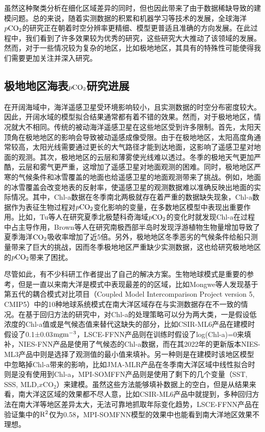 虽然这种聚类分析在细化区域差异的同时，但也因此带来了由于数据稀缺导致的建模问题。总的来说，随着实测数据的积累和机器学习等技术的发展，全球海洋$p\rm CO_2$的研究正在朝着时空分辨率更精细、模型更普适且准确的方向发展。在此过程中，我们看到了许多效果较为优秀的研究，这些研究大大推动了该领域的发展。然而，对于一些情况较为复杂的地区，比如极地地区，其具有的特殊性可能使得我们需要更加关注并深入研究。

\subsection{极地地区海表\texorpdfstring{$p\rm CO_2$}{}研究进展}
在开阔海域中，海洋遥感卫星受环境影响较小，且实测数据的时空分布密度较大。因此，开阔水域的模型拟合结果通常都有着不错的效果。然而，对于极地地区，情况就大不相同。传统的被动海洋遥感卫星在这些地区受到许多限制。首先，太阳天顶角在极地地区的影响会导致被动遥感成像受限。由于在极地地区，太阳高度角通常较高，太阳光线需要通过更长的大气路径才能到达地面，这影响了遥感卫星对地面的观测。其次，极地地区的云层和薄雾使光线难以透过。冬季的极地天气更加严酷，云层和雾气更严重，这增加了遥感卫星对地面观测的困难。同时，极地地区严寒的气候条件和冰雪覆盖的地面也给遥感卫星的地面观测带来了挑战。例如，地面的冰雪覆盖会改变地表的反射率，使遥感卫星的观测数据难以准确反映出地面的实际情况。其中，Chl-a数据在冬季南北两极就存在着严重的数据缺失现象，Chl-a数据作为表征生物过程对$p\rm CO_2$变化影响的变量，在多数地区模型中表现出重要作用。比如，Tu等人\cite{tu2021increase}在研究夏季北极楚科奇海域$p\rm CO_2$的变化时就发现Chl-a在过程中占主导作用，Brown等人\cite{brown2019enhanced}在研究南极西部半岛时发现浮游植物生物量增加导致了夏季海洋$\rm CO_2$吸收率增加了近5倍。另外，极地地区冬季恶劣的气候条件给船只测量带来了巨大的挑战，因而冬季极地地区严重缺少实测数据，这也给研究极地地区的$p\rm CO_2$带来了困扰。

尽管如此，有不少科研工作者提出了自己的解决方案。生物地球模式\cite{mongwe2016seasonal,mongwe2018seasonal,kessler2016southern}是重要的参考，但是一直以来南大洋是模式中表现最差的的区域，比如Mongwe等人\cite{mongwe2018seasonal}发现基于第五代的耦合模式对比项目（Coupled Model Intercomparison Project version 5, CMIP5）中的10种地球系统模式在南大洋区域存在与实测数据存在不一致的情况。在基于回归方法的研究中，对Chl-a的处理策略可以分为两大类，一是假设低浓度的Chl-a值或是气候态值来替代这缺失的部分，比如CSIR-ML6产品\cite{CSIR_ML6}在建模时假设了0.1±0.03$\rm mg m^{-3}$，LSCE-FFNN产品\cite{LSCE_FFNN}则在训练时假设了log(Chl-a)=0来填补，NIES-FNN产品\cite{zeng2014global}是使用了气候态的Chl-a数据，而在其2022年的更新版本NIES-ML3产品\cite{zeng2022surface}中则是选择了观测值的最小值来填补。另一种则是在建模时该地区模型中忽略掉Chl-a带来的影响，比如JMA-MLR产品\cite{JMA_MLR}在冬季南大洋区域中线性拟合时则是没有使用到Chl-a，MPI-SOMFFN产品\cite{MPI_SOMFFN}则是使用了剩下的几个变量（SST, SSS, MLD,$x\mathrm{CO_2}$）来建模。虽然这些方法能够填补数据上的空白，但是从结果来看，南大洋这区域的效果都不尽人意，比如CSIR-ML6产品\cite{CSIR_ML6}中就提到，多种回归方法在南大洋等地区差异太大，无法可靠地抓取年际变化趋势，LSCE-FFNN产品\cite{LSCE_FFNN}在验证集中的$\rm R^2$仅为0.58，MPI-SOMFNN模型\cite{MPI_SOMFFN}的效果中也能看到南大洋地区效果不理想。

